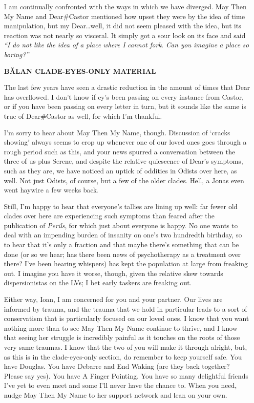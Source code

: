 I am continually confronted with the ways in which we have diverged. May Then My Name and Dear\#Castor mentioned how upset they were by the idea of time manipulation, but my Dear\ldots well, it did not seem pleased with the idea, but its reaction was not nearly so visceral. It simply got a sour look on its face and said \emph{``I do not like the idea of a place where I cannot fork. Can you imagine a place so boring?''}

\begin{center}
\textbf{BĂLAN CLADE-EYES-ONLY MATERIAL}
\end{center}

The last few years have seen a drastic reduction in the amount of times that Dear has overflowed. I don't know if ey's been passing on every instance from Castor, or if you have been passing on every letter in turn, but it sounds like the same is true of Dear\#Castor as well, for which I'm thankful.

I'm sorry to hear about May Then My Name, though. Discussion of `cracks showing' always seems to crop up whenever one of our loved ones goes through a rough period such as this, and your news spurred a conversation between the three of us plus Serene, and despite the relative quiescence of Dear's symptoms, such as they are, we have noticed an uptick of oddities in Odists over here, as well. Not just Odists, of course, but a few of the older clades. Hell, a Jonas even went haywire a few weeks back.

Still, I'm happy to hear that everyone's tallies are lining up well: far fewer old clades over here are experiencing such symptoms than feared after the publication of \emph{Perils}, for which just about everyone is happy. No one wants to deal with an impending burden of insanity on one's two hundredth birthday, so to hear that it's only a fraction and that maybe there's something that can be done (or so we hear; has there been news of psychotherapy as a treatment over there? I've been hearing whispers) has kept the population at large from freaking out. I imagine you have it worse, though, given the relative skew towards dispersionistas on the LVs; I bet early taskers are freaking out.

Either way, Ioan, I am concerned for you and your partner. Our lives are informed by trauma, and the trauma that we hold in particular leads to a sort of conservatism that is particularly focused on our loved ones. I know that you want nothing more than to see May Then My Name continue to thrive, and I know that seeing her struggle is incredibly painful as it touches on the roots of those very same traumas. I know that the two of you will make it through alright, but, as this is in the clade-eyes-only section, do remember to keep yourself safe. You have Douglas. You have Debarre and End Waking (are they back together? Please say yes). You have A Finger Pointing. You have so many delightful friends I've yet to even meet and some I'll never have the chance to. When you need, nudge May Then My Name to her support network and lean on your own.

